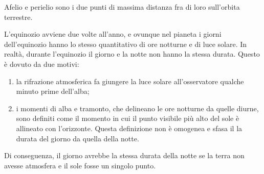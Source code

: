 \documentclass[a4paper]{article}
\begin{document}

Afelio e perielio sono i due punti di massima distanza fra di loro sull'orbita terrestre.


L'equinozio avviene due volte all'anno, e ovunque nel pianeta i giorni dell'equinozio hanno lo stesso quantitativo di ore notturne e di luce solare.
In realtà, durante l'equinozio il giorno e la notte non hanno la stessa durata.
Questo è dovuto da due motivi:
\begin{enumerate}
    \item la rifrazione atmosferica fa giungere la luce solare all'osservatore qualche minuto prime dell'alba;
    \item i momenti di alba e tramonto, che delineano le ore notturne da quelle diurne, sono definiti come il momento in cui il punto visibile più alto del sole è allineato con l'orizzonte. Questa definizione non è omogenea e sfasa il la durata del giorno da quella della notte.
\end{enumerate}
Di conseguenza, il giorno avrebbe la stessa durata della notte se la terra non avesse atmosfera e il sole fosse un singolo punto.

\end{document}
